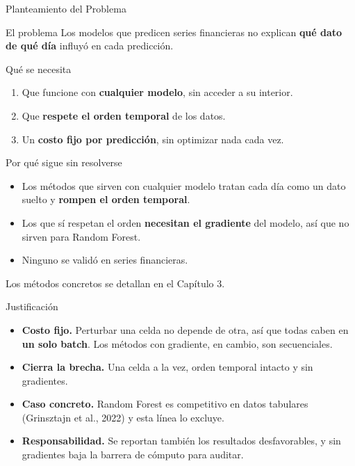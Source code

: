 \documentclass{beamer}
\begin{document}
\begin{frame}{Planteamiento del Problema}
    \begin{block}{El problema}
        Los modelos que predicen series financieras no explican
        \textbf{qué dato de qué día} influyó en cada predicción.
    \end{block}
    \begin{block}{Qué se necesita}
        \begin{enumerate}
            \item Que funcione con \textbf{cualquier modelo}, sin acceder
            a su interior.
            \item Que \textbf{respete el orden temporal} de los datos.
            \item Un \textbf{costo fijo por predicción}, sin optimizar
            nada cada vez.
        \end{enumerate}
    \end{block}
    \begin{alertblock}{Por qué sigue sin resolverse}
        \begin{itemize}
            \item Los métodos que sirven con cualquier modelo tratan cada
            día como un dato suelto y \textbf{rompen el orden temporal}.
            \item Los que sí respetan el orden \textbf{necesitan el
            gradiente} del modelo, así que no sirven para Random Forest.
            \item Ninguno se validó en series financieras.
        \end{itemize}
    \end{alertblock}
    \begin{center}
        \footnotesize Los métodos concretos se detallan en el Capítulo 3.
    \end{center}
\end{frame}

\begin{frame}{Justificación}
    \begin{itemize}
        \item \textbf{Costo fijo.} Perturbar una celda no depende de
        otra, así que todas caben en \textbf{un solo batch}. Los métodos
        con gradiente, en cambio, son secuenciales.
        \vspace{0.2cm}
        \item \textbf{Cierra la brecha.} Una celda a la vez, orden
        temporal intacto y sin gradientes.
        \vspace{0.2cm}
        \item \textbf{Caso concreto.} Random Forest es competitivo en
        datos tabulares (Grinsztajn et al., 2022) y esta línea lo
        excluye.
        \vspace{0.2cm}
        \item \textbf{Responsabilidad.} Se reportan también los
        resultados desfavorables, y sin gradientes baja la barrera de
        cómputo para auditar.
    \end{itemize}
\end{frame}
\end{document}
